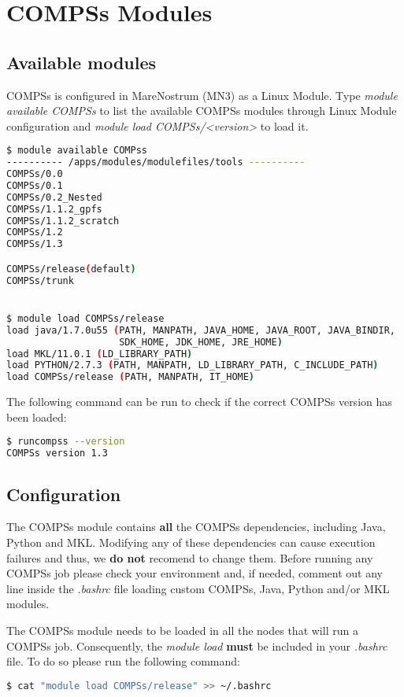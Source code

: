 \section{COMPSs Modules}
\label{sec:Modules}


\subsection{Available modules}
COMPSs is configured in MareNostrum (MN3) as a Linux Module. Type \textit{module available COMPSs} to list the available COMPSs modules 
through Linux Module configuration and \textit{module load COMPSs/<version>} to load it.
\begin{lstlisting}[language=bash]
$ module available COMPss
---------- /apps/modules/modulefiles/tools ----------
COMPSs/0.0                          
COMPSs/0.1
COMPSs/0.2_Nested
COMPSs/1.1.2_gpfs
COMPSs/1.1.2_scratch
COMPSs/1.2 
COMPSs/1.3

COMPSs/release(default)
COMPSs/trunk


$ module load COMPSs/release
load java/1.7.0u55 (PATH, MANPATH, JAVA_HOME, JAVA_ROOT, JAVA_BINDIR, 
                    SDK_HOME, JDK_HOME, JRE_HOME)
load MKL/11.0.1 (LD_LIBRARY_PATH)
load PYTHON/2.7.3 (PATH, MANPATH, LD_LIBRARY_PATH, C_INCLUDE_PATH)
load COMPSs/release (PATH, MANPATH, IT_HOME)
\end{lstlisting}

The following command can be run to check if the correct COMPSs version has been loaded:
\begin{lstlisting}[language=bash]
$ runcompss --version
COMPSs version 1.3

\end{lstlisting}

\subsection{Configuration}
The COMPSs module contains \textbf{all} the COMPSs dependencies, including Java, Python and MKL. Modifying any of these dependencies
can cause execution failures and thus, we \textbf{do not} recomend to change them. Before running any COMPSs job please check your 
environment and, if needed, comment out any line inside the \textit{.bashrc} file loading custom COMPSs, Java, Python and/or MKL
modules.

The COMPSs module needs to be loaded in all the nodes that will run a COMPSs job. Consequently, the \textit{module load} \textbf{must}
be included in your \textit{.bashrc} file. To do so please run the following command:
\begin{lstlisting}[language=bash]
$ cat "module load COMPSs/release" >> ~/.bashrc
\end{lstlisting}

